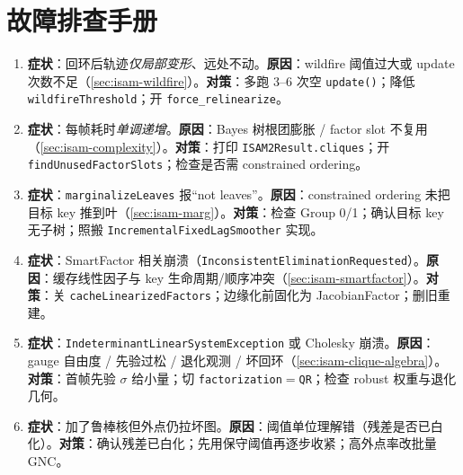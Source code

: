 \section*{故障排查手册}
\begin{enumerate}
  \item \textbf{症状}：回环后轨迹\emph{仅局部变形}、远处不动。\textbf{原因}：wildfire 阈值过大或 update 次数不足（\cref{sec:isam-wildfire}）。\textbf{对策}：多跑 $3$--$6$ 次空 \texttt{update()}；降低 \texttt{wildfireThreshold}；开 \texttt{force\_relinearize}。
  \item \textbf{症状}：每帧耗时\emph{单调递增}。\textbf{原因}：Bayes 树根团膨胀 / factor slot 不复用（\cref{sec:isam-complexity}）。\textbf{对策}：打印 \texttt{ISAM2Result.cliques}；开 \texttt{findUnusedFactorSlots}；检查是否需 constrained ordering。
  \item \textbf{症状}：\texttt{marginalizeLeaves} 报“not leaves”。\textbf{原因}：constrained ordering 未把目标 key 推到叶（\cref{sec:isam-marg}）。\textbf{对策}：检查 Group 0/1；确认目标 key 无子树；照搬 \texttt{IncrementalFixedLagSmoother} 实现。
  \item \textbf{症状}：SmartFactor 相关崩溃（\texttt{InconsistentEliminationRequested}）。\textbf{原因}：缓存线性因子与 key 生命周期/顺序冲突（\cref{sec:isam-smartfactor}）。\textbf{对策}：关 \texttt{cacheLinearizedFactors}；边缘化前固化为 JacobianFactor；删旧重建。
  \item \textbf{症状}：\texttt{IndeterminantLinearSystemException} 或 Cholesky 崩溃。\textbf{原因}：gauge 自由度 / 先验过松 / 退化观测 / 坏回环（\cref{sec:isam-clique-algebra}）。\textbf{对策}：首帧先验 $\sigma$ 给小量；切 \texttt{factorization}$=$\texttt{QR}；检查 robust 权重与退化几何。
  \item \textbf{症状}：加了鲁棒核但外点仍拉坏图。\textbf{原因}：阈值单位理解错（残差是否已白化）。\textbf{对策}：确认残差已白化；先用保守阈值再逐步收紧；高外点率改批量 GNC。
\end{enumerate}
